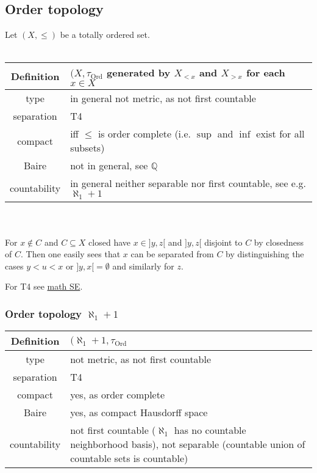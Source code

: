\documentclass{scrartcl}
\newcommand{\Q}{\mathbb{Q}}
\begin{document}
\subsection{Order topology}
\label{top:order_topology}
Let $(X, \leq)$ be a totally ordered set.
\\\\
\begin{tabular}{c | p{}}
    Definition & $(X, \tau_{\mathrm{Ord}}$ generated by $X_{<x}$ and $X_{>x}$ for each $x \in X$ \\
    \hline
    type & in general not metric, as not first countable \\
    separation & T4 \\
    compact & iff $\leq$ is order complete (i.e. $\sup$ and $\inf$ exist for all subsets) \\
    Baire & not in general, see $\Q$ \\
    countability & in general neither separable nor first countable, see e.g. $\aleph_1 + 1$
\end{tabular}
\\\\
For $x \notin C$ and $C \subseteq X$ closed have $x \in ]y, z[$ and $]y, z[$ disjoint to $C$ by closedness of $C$. Then one easily sees that $x$ can be separated from $C$ by distinguishing the cases $y < u < x$ or $]y, x[ = \emptyset$ and similarly for $z$.

For T4 see \href{https://math.stackexchange.com/questions/980584/is-every-linear-ordered-set-normal-in-its-order-topology}{math SE}.

\subsubsection{Order topology $\aleph_1 + 1$}

\begin{tabular}{c | p{}}
    Definition & $(\aleph_1 + 1, \tau_{\mathrm{Ord}}$ \\
    \hline
    type & not metric, as not first countable \\
    separation & T4 \\
    compact & yes, as order complete \\
    Baire & yes, as compact Hausdorff space \\
    countability & not first countable ($\aleph_1$ has no countable neighborhood basis), not separable (countable union of countable sets is countable)
\end{tabular}
\end{document}
